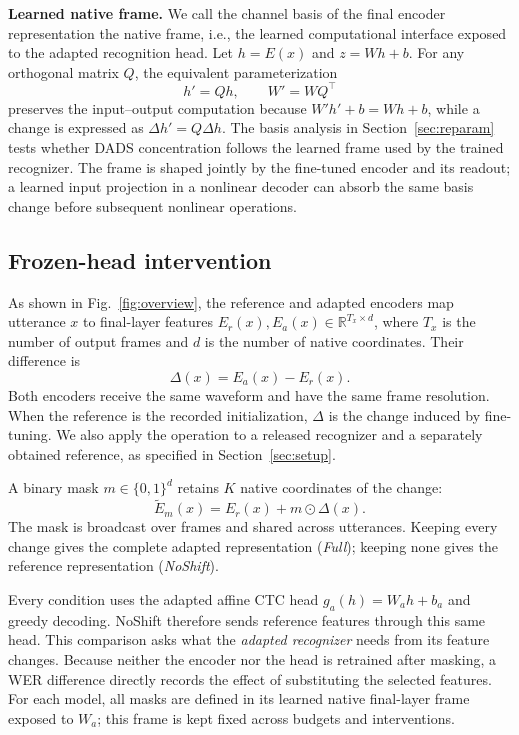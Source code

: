 \documentclass{article}
\begin{document}
\textbf{Learned native frame.} We call the channel basis of the final encoder representation the native frame, i.e., the learned computational interface exposed to the adapted recognition head. Let $h=E(x)$ and $z=Wh+b$. For any orthogonal matrix $Q$, the equivalent parameterization
\begin{equation}
 h'=Qh, \qquad W'=WQ^\top
 \label{eq:orthogonal_interface}
\end{equation}
preserves the input--output computation because $W'h'+b=Wh+b$, while a change is expressed as $\Delta h'=Q\Delta h$. The basis analysis in Section~\ref{sec:reparam} tests whether DADS concentration follows the learned frame used by the trained recognizer. The frame is shaped jointly by the fine-tuned encoder and its readout; a learned input projection in a nonlinear decoder can absorb the same basis change before subsequent nonlinear operations.


\subsection{Frozen-head intervention}
As shown in Fig.~\ref{fig:overview}, the reference and adapted encoders map utterance $x$ to final-layer features $E_r(x),E_a(x)\in\mathbb{R}^{T_x\times d}$, where $T_x$ is the number of output frames and $d$ is the number of native coordinates. Their difference is
\begin{equation}
 \Delta(x)=E_a(x)-E_r(x).
 \label{eq:shift}
\end{equation}
Both encoders receive the same waveform and have the same frame resolution. When the reference is the recorded initialization, $\Delta$ is the change induced by fine-tuning. We also apply the operation to a released recognizer and a separately obtained reference, as specified in Section~\ref{sec:setup}.

A binary mask $m\in\{0,1\}^{d}$ retains $K$ native coordinates of the change:
\begin{equation}
 \widetilde E_m(x)=E_r(x)+m\odot\Delta(x).
 \label{eq:mask}
\end{equation}
The mask is broadcast over frames and shared across utterances. Keeping every change gives the complete adapted representation (\emph{Full}); keeping none gives the reference representation (\emph{NoShift}).

Every condition uses the adapted affine CTC head $g_a(h)=W_ah+b_a$ and greedy decoding. NoShift therefore sends reference features through this same head. This comparison asks what the \emph{adapted recognizer} needs from its feature changes. Because neither the encoder nor the head is retrained after masking, a WER difference directly records the effect of substituting the selected features. For each model, all masks are defined in its learned native final-layer frame exposed to $W_a$; this frame is kept fixed across budgets and interventions.
\end{document}
